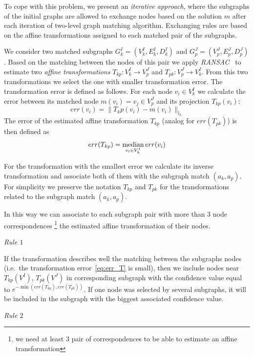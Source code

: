 To cope with this problem, we present an \emph{iterative approach}, where the subgraphs of the initial graphs are allowed to exchange nodes based on the solution $m$ after each iteration of two-level graph matching algorithm. Exchanging rules are based on the affine transformations assigned to each matched pair of the subgraphs.

We consider two matched subgraphs $G^I_k=(V^I_k, E^I_k, D^I_k)$ and  $G^J_p=(V^J_p, E^J_p, D^J_p)$. Based on the matching between the nodes of this pair we apply \emph{RANSAC}~\cite{RANSAC} to estimate two \emph{affine transformations} $T_{kp}:V^I_k\rightarrow V^J_p$ and $T_{pk}:V^J_p\rightarrow V^I_k$. From this two transformations we select the one with smaller transformation error. The transformation error is defined as follows. For each node $v_i\in V^I_k$ we calculate the error between its matched node $m(v_i) = v_j\in V^J_p$ and its projection $T_{kp}(v_i)$: 
\begin{equation} \label{eq:err_v}
err(v_i) = \|T_kp(v_i) - m(v_i)\|_{l_2}
\end{equation}
The error of the estimated affine transformation $T_{kp}$ (analog for  $err(T_{pk})$) is then defined as
\begin{equation} \label{eq:err_T}
err(T_{kp}) = \mathop{\rm median}_{v_i\in V^I_k}err(v_i)
\end{equation}

For the transformation with the smallest error we calculate its inverse transformation and associate both of them with the subgraph match $(a_k, a_p)$. For simplicity we preserve the notation $T_{kp}$ and $T_{pk}$ for the transformations related to the subgraph match $(a_k, a_p)$.

In this way we can associate to each subgraph pair with more than $3$ node correspondences \footnote{we need at least $3$ pair of correspondences to be able to estimate an affine transformation} the estimated affine transformation of their nodes.

\textit{Rule $1$}

If the transformation describes well the matching between the subgraphs nodes (i.e.\ the transformation error~\ref{eq:err_T} is small), then we include nodes near $T_{kp}(V^I)$, $T_{pk}(V^J)$ in corresponding subgraph with the confidence value equal to $e^{-\min(err(T_{kp}), err(T_{pk}))}$. If one node was selected by several subgraphs, it will be included in the subgraph with the biggest associated confidence value.

\textit{Rule $2$}

